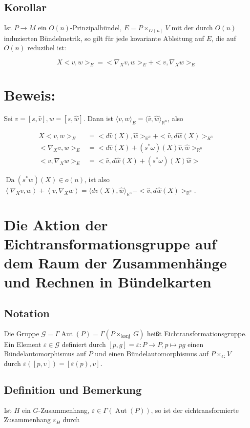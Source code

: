 \documentclass[10pt, letterpaper]{article}
\begin{document}
\subsection*{Korollar}
Ist $P \rightarrow M$ ein $O(n)$-Prinzipalbündel, $E=P \times_{O(n)} V$ mit der durch $O(n)$ induzierten Bündelmetrik, so gilt für jede kovariante Ableitung auf $E$, die auf $O(n)$ reduzibel ist:

$$
X<v, w>_{E}=<\nabla_{X} v, w>_{E}+<v, \nabla_{X} w>_{E}
$$

\section*{Beweis:}
Sei $v=[s, \hat{v}], w=[s, \hat{w}]$. Dann ist $\langle v, w\rangle_{E}=\langle\hat{v}, \hat{w}\rangle_{\mathbb{R}^{n}}$, also

$$
\begin{aligned}
X<v, w>_{E} & =<d \hat{v}(X), \hat{w}>_{\mathbb{R}^{n}}+<\hat{v}, d \hat{w}(X)>_{R^{n}} \\
<\nabla_{X} v, w>_{E} & =<d \hat{v}(X)+\left(s^{*} \omega\right)(X) \hat{v}, \hat{w}>_{\mathbb{R}^{n}} \\
<v, \nabla_{X} w>_{E} & =<\hat{v}, d \hat{w}(X)+\left(s^{*} \omega\right)(X) \hat{w}>
\end{aligned}
$$

$\operatorname{Da}\left(s^{*} w\right)(X) \in o(n)$, ist also $\left\langle\nabla_{X} v, w\right\rangle+\left\langle v, \nabla_{X} w\right\rangle=\langle d \hat{v}(X), \hat{w}\rangle_{\mathbb{R}^{n}} +<\hat{v}, d \hat{w}(X)>_{\mathbb{R}^{n}}$.

\section*{Die Aktion der Eichtransformationsgruppe auf dem Raum der Zusammenhänge und Rechnen in Bündelkarten}
\subsection*{Notation}
Die Gruppe $\mathcal{G}=\Gamma \operatorname{Aut}(P)=\Gamma\left(P \times_{\text {konj }} G\right)$ heißt Eichtransformationsgruppe. Ein Element $\varepsilon \in \mathcal{G}$ definiert durch $[p, g]=\varepsilon: P \rightarrow P, p \mapsto p g$ einen Bündelautomorphismus auf $P$ und einen Bündelautomorphismus auf $P \times_{G} V$ durch $\varepsilon([p, v])=[\varepsilon(p), v]$.

\subsection*{Definition und Bemerkung}
Ist $H$ ein $G$-Zusammenhang, $\varepsilon \in \Gamma(\operatorname{Aut}(P))$, so ist der eichtransformierte Zusammenhang $\varepsilon_{H}$ durch
\end{document}
